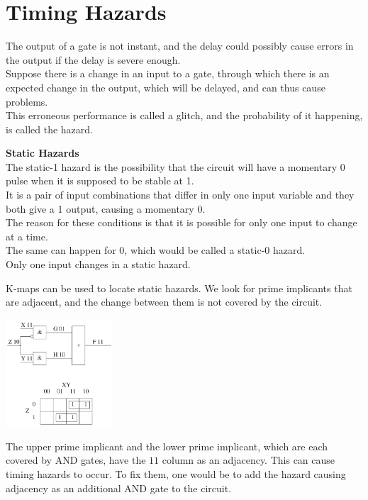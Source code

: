 \documentclass[nobib]{tufte-handout}
\begin{document}
\section{Timing Hazards}
The output of a gate is not instant, and the delay could possibly cause errors
in the output if the delay is severe enough.\\ Suppose there is a change in an
input to a gate, through which there is an expected change in the output, which
will be delayed, and can thus cause problems.\\ This erroneous performance is
called a glitch, and the probability of it happening, is called the hazard.\\
\begin{mdframed}
    \textbf{Static Hazards}\\
    The static-1 hazard is the possibility that the circuit will have a momentary 0 pulse when it is supposed to be stable at 1.\\
    It is a pair of input combinations that differ in only one input variable and they both give a 1 output, causing a momentary 0.\\
    The reason for these conditions is that it is possible for only one input to change at a time.\\
    The same can happen for 0, which would be called a static-0 hazard.\\
    Only one input changes in a static hazard.
\end{mdframed}
K-maps can be used to locate static hazards. We look for prime implicants that are adjacent, and the change between them is not covered by the circuit.\\
\begin{center}
    \includegraphics[width = 150px]{images/kmaphazard.png}
\end{center}
The upper prime implicant and the lower prime implicant, which are each covered by AND gates, have the $11$ column as an adjacency. This can cause timing hazards to occur. To fix them, one would be to add the hazard causing adjacency as an additional AND gate to the circuit.\\
\end{document}
